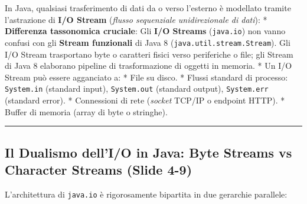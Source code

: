 \documentclass[11pt,a4paper,oneside]{report}
\newcommand{\passthrough}[1]{#1}
\begin{document}
In Java, qualsiasi trasferimento di dati da o verso l'esterno è
modellato tramite l'astrazione di \textbf{I/O Stream} (\emph{flusso
sequenziale unidirezionale di dati}): * \textbf{Differenza tassonomica
cruciale}: Gli \textbf{I/O Streams} (\passthrough{\lstinline!java.io!})
non vanno confusi con gli \textbf{Stream funzionali} di Java 8
(\passthrough{\lstinline!java.util.stream.Stream!}). Gli I/O Stream
trasportano byte o caratteri fisici verso periferiche o file; gli Stream
di Java 8 elaborano pipeline di trasformazione di oggetti in memoria. *
Un I/O Stream può essere agganciato a: * File su disco. * Flussi
standard di processo: \passthrough{\lstinline!System.in!} (standard
input), \passthrough{\lstinline!System.out!} (standard output),
\passthrough{\lstinline!System.err!} (standard error). * Connessioni di
rete (\emph{socket} TCP/IP o endpoint HTTP). * Buffer di memoria (array
di byte o stringhe).

\begin{center}\rule{0.5\linewidth}{0.5pt}\end{center}

\subsection{Il Dualismo dell'I/O in Java: Byte Streams vs Character
Streams (Slide
4-9)}\label{chap19_il-dualismo-dellio-in-java-byte-streams-vs-character-streams-slide-4-9}

L'architettura di \passthrough{\lstinline!java.io!} è rigorosamente
bipartita in due gerarchie parallele:
\end{document}

